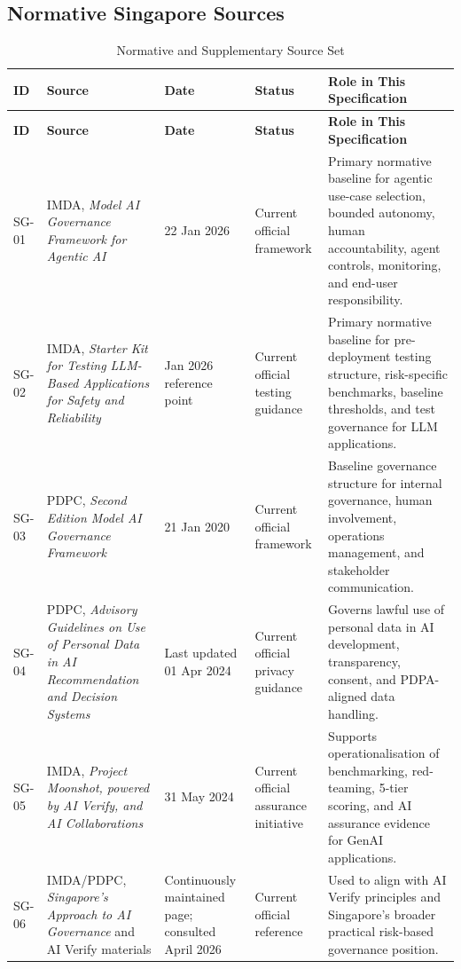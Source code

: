 \documentclass[11pt,a4paper]{article}
\begin{document}
\subsection{Normative Singapore Sources}

\begin{longtable}{P{0.10\textwidth}P{0.28\textwidth}P{0.11\textwidth}P{0.16\textwidth}P{0.27\textwidth}}
\caption{Normative and Supplementary Source Set} \\
\toprule
\textbf{ID} & \textbf{Source} & \textbf{Date} & \textbf{Status} & \textbf{Role in This Specification} \\
\midrule
\endfirsthead
\toprule
\textbf{ID} & \textbf{Source} & \textbf{Date} & \textbf{Status} & \textbf{Role in This Specification} \\
\midrule
\endhead
SG-01 & IMDA, \emph{Model AI Governance Framework for Agentic AI} & 22 Jan 2026 & Current official framework & Primary normative baseline for agentic use-case selection, bounded autonomy, human accountability, agent controls, monitoring, and end-user responsibility. \\
SG-02 & IMDA, \emph{Starter Kit for Testing LLM-Based Applications for Safety and Reliability} & Jan 2026 reference point & Current official testing guidance & Primary normative baseline for pre-deployment testing structure, risk-specific benchmarks, baseline thresholds, and test governance for LLM applications. \\
SG-03 & PDPC, \emph{Second Edition Model AI Governance Framework} & 21 Jan 2020 & Current official framework & Baseline governance structure for internal governance, human involvement, operations management, and stakeholder communication. \\
SG-04 & PDPC, \emph{Advisory Guidelines on Use of Personal Data in AI Recommendation and Decision Systems} & Last updated 01 Apr 2024 & Current official privacy guidance & Governs lawful use of personal data in AI development, transparency, consent, and PDPA-aligned data handling. \\
SG-05 & IMDA, \emph{Project Moonshot, powered by AI Verify, and AI Collaborations} & 31 May 2024 & Current official assurance initiative & Supports operationalisation of benchmarking, red-teaming, 5-tier scoring, and AI assurance evidence for GenAI applications. \\
SG-06 & IMDA/PDPC, \emph{Singapore's Approach to AI Governance} and AI Verify materials & Continuously maintained page; consulted April 2026 & Current official reference & Used to align with AI Verify principles and Singapore's broader practical risk-based governance position. \\

\end{longtable}
\end{document}
